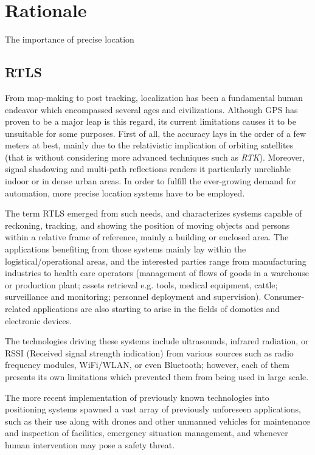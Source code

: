 \section{Rationale}
The importance of precise location

\subsection{RTLS}

From map-making to post tracking, localization has been a fundamental human endeavor which encompassed several ages and civilizations.
Although GPS has proven to be a major leap is this regard, its current limitations causes it to be unsuitable for some purposes.
First of all, the accuracy lays in the order of a few meters at best, mainly due to the relativistic implication of orbiting satellites \cite{gps} (that is without considering more advanced techniques such as \emph{RTK}).
Moreover, signal shadowing and multi-path reflections renders it particularly unreliable indoor or in dense urban areas.
In order to fulfill the ever-growing demand for automation, more precise location systems have to be employed.

The term RTLS emerged from such needs, and characterizes systems capable of reckoning, tracking, and showing the position of moving objects and persons within a relative frame of reference, mainly a building or enclosed area.
The applications benefiting from those systems mainly lay within the logistical/operational areas, and the interested parties range from manufacturing industries to health care operators (management of flows of goods in a warehouse or production plant; assets retrieval e.g. tools, medical equipment, cattle; surveillance and monitoring; personnel deployment and supervision).
Consumer-related applications are also starting to arise in the fields of domotics and electronic devices.

The technologies driving these systems include ultrasounds, infrared radiation, or RSSI (Received signal strength indication) from various sources such as radio frequency modules, WiFi/WLAN, or even Bluetooth; however, each of them presents its own limitations which prevented them from being used in large scale. \cite{joost}

The more recent implementation of previously known technologies into positioning systems spawned a vast array of previously unforeseen applications, such as their use along with drones and other unmanned vehicles for maintenance and inspection of facilities, emergency situation management, and whenever human intervention may pose a safety threat.


